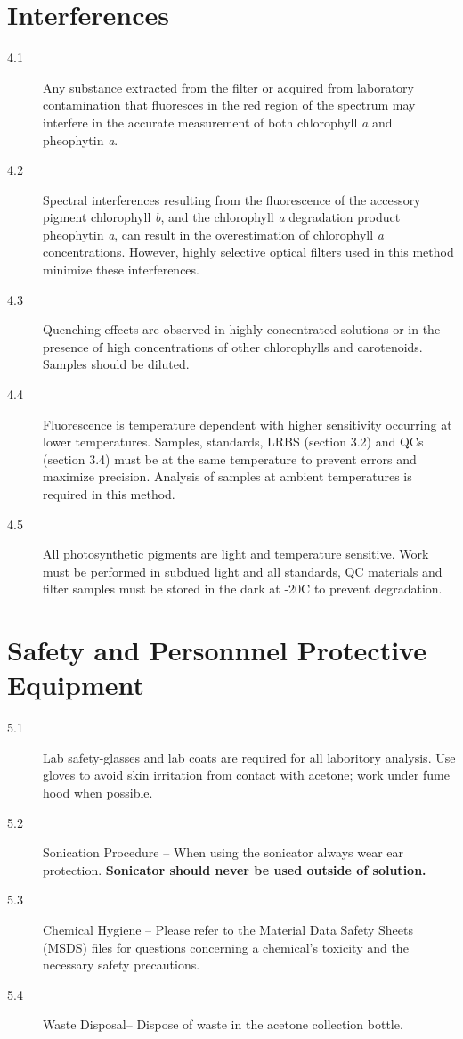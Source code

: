 \documentclass{article}
\begin{document}
\section{Interferences}
\begin{description}
\item[4.1] Any substance extracted from the filter or acquired from laboratory contamination that fluoresces in the red region of the spectrum may interfere in the accurate measurement of both chlorophyll \textit{a} and pheophytin \textit{a}.
\item[4.2] Spectral interferences resulting from the fluorescence of the accessory pigment chlorophyll \textit{b}, and the chlorophyll \textit{a} degradation product pheophytin \textit{a}, can result in the overestimation of chlorophyll \textit{a} concentrations. However, highly selective optical filters used in this method minimize these interferences. 
\item[4.3] Quenching effects are observed in highly concentrated solutions or in the presence of high concentrations of other chlorophylls and carotenoids. Samples should be diluted. 
\item[4.4] Fluorescence is temperature dependent with higher sensitivity occurring at lower temperatures. Samples, standards, LRBS (section 3.2) and QCs (section 3.4) must be at the same temperature to prevent errors and maximize precision. Analysis of samples at ambient temperatures is required in this method. 
\item[4.5] All photosynthetic pigments are light and temperature sensitive. Work must be performed in subdued light and all standards, QC materials and filter samples must be stored in the dark at -20\degree C to prevent degradation.
\end{description}

\section{Safety and Personnnel Protective Equipment}
\begin{description}
\item[5.1] Lab safety-glasses and lab coats are required for all laboritory analysis. Use gloves to avoid skin irritation from contact with acetone; work under fume hood when possible. 
\item[5.2] Sonication Procedure -- When using the sonicator always wear ear protection. \textbf {Sonicator should never be used outside of solution.}
\item[5.3] Chemical Hygiene -- Please refer to the Material Data Safety Sheets (MSDS) files for questions concerning a chemical's toxicity and the necessary safety precautions.
\item[5.4] Waste Disposal-- Dispose of waste in the acetone collection bottle. %
\end{description}
\end{document}
